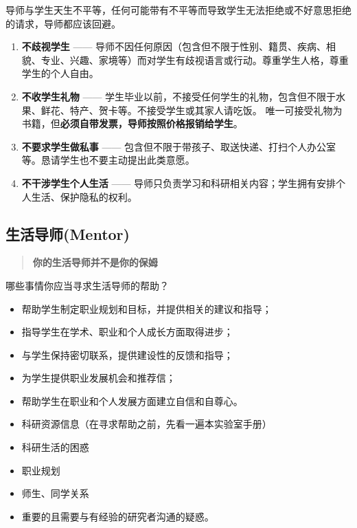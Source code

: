 \documentclass[
]{ctexbook}
\providecommand{\tightlist}{%
  \setlength{\itemsep}{0pt}\setlength{\parskip}{0pt}}
\begin{document}
导师与学生天生不平等，任何可能带有不平等而导致学生无法拒绝或不好意思拒绝的请求，导师都应该回避。

\begin{enumerate}
\def\labelenumi{\arabic{enumi}.}
\item
  \textbf{不歧视学生} ------
  导师不因任何原因（包含但不限于性别、籍贯、疾病、相貌、专业、兴趣、家境等）而对学生有歧视语言或行动。尊重学生人格，尊重学生的个人自由。
\item
  \textbf{不收学生礼物} ------
  学生毕业以前，不接受任何学生的礼物，包含但不限于水果、鲜花、特产、贺卡等。不接受学生或其家人请吃饭。
  唯一可接受礼物为书籍，但\textbf{必须自带发票，导师按照价格报销给学生}。
\item
  \textbf{不要求学生做私事} ------
  包含但不限于带孩子、取送快递、打扫个人办公室等。恳请学生也不要主动提出此类意愿。
\item
  \textbf{不干涉学生个人生活} ------ 导师只负责学习和科研相关内容；学生拥有安排个人生活、保护隐私的权利。
\end{enumerate}

\hypertarget{ux751fux6d3bux5bfcux5e08mentor}{%
\subsection{生活导师(Mentor)}\label{ux751fux6d3bux5bfcux5e08mentor}}

\begin{quote}
\textbf{你的生活导师并不是你的保姆}
\end{quote}

哪些事情你应当寻求生活导师的帮助？

\begin{itemize}
\tightlist
\item
  帮助学生制定职业规划和目标，并提供相关的建议和指导；
\item
  指导学生在学术、职业和个人成长方面取得进步；
\item
  与学生保持密切联系，提供建设性的反馈和指导；
\item
  为学生提供职业发展机会和推荐信；
\item
  帮助学生在职业和个人发展方面建立自信和自尊心。
\item
  科研资源信息（在寻求帮助之前，先看一遍本实验室手册）
\item
  科研生活的困惑
\item
  职业规划
\item
  师生、同学关系
\item
  重要的且需要与有经验的研究者沟通的疑惑。
\end{itemize}
\end{document}
